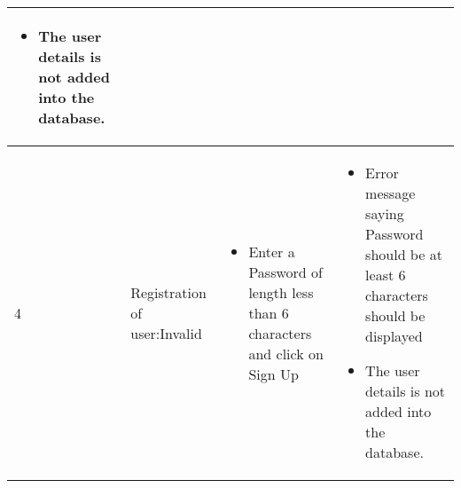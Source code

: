 \documentclass[english,a4paper,12pt]{report}
\begin{document}
\begin{longtable} { | p{2cm} | p{3cm}| p{6cm}| p{6cm} |}
\begin{itemize}
    \item The user details is not added into the database.
\end{itemize}\\
\hline 4 &  Registration of user:Invalid
& 
\vspace{-5mm}
\begin{itemize}
    \item Enter a Password of length less than 6 characters and click on Sign Up 
\end{itemize} & 
\vspace{-5mm}
\begin{itemize}
    \item Error message saying Password should be at least 6 characters should be displayed  
    \item The user details is not added into the database.
\end{itemize}\\
\hline
\end{longtable}
\end{document}
